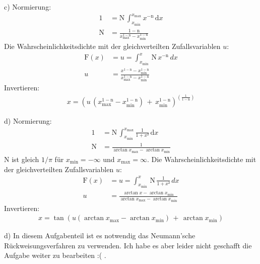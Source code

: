 \documentclass[
  bibliography=totoc,     %
  captions=tableheading,  %
  titlepage=firstiscover, %
]{scrartcl}
\begin{document}
\noindent
c) Normierung:
\begin{align*}
  1 &= \mathup{N}\,\int_{x_{\mathup{min}}}^{x_{\mathup{max}}}x^{-\mathup{n}}\,\mathup{d}x\\
  \mathup{N} &= \frac{1-\mathup{n}}{x_\mathup{max}^{1-\mathup{n}}-x_\mathup{min}^{1-\mathup{n}}}
\end{align*}
Die Wahrscheinlichkeitsdichte mit der gleichverteilten Zufallsvariablen $u$:
\begin{align*}
  \mathup{F}(x) &= u = \int_{x_{\mathup{min}}}^{x}\,\mathup{N}\,x^{-\mathup{n}}\,{d}x \\
  u &= \frac{x^{1-\mathup{n}}-x_\mathup{min}^{1-\mathup{n}}}{x_\mathup{max}^{1-\mathup{n}}-x_\mathup{min}^{1-\mathup{n}}}
\end{align*}
Invertieren:
\begin{align*}
  x = (u\,(x_\mathup{max}^{1-\mathup{n}}-x_\mathup{min}^{1-\mathup{n}})\,+\,x_{\mathup{min}}^{1-\mathup{n}})^{(\frac{1}{1-\mathup{n}})}
\end{align*}

\noindent
d) Normierung:
\begin{align*}
  1 &= \mathup{N}\,\int_{x_{\mathup{min}}}^{x_{\mathup{max}}}\frac{1}{1+x²}\,\mathup{d}x\\
  \mathup{N} &= \frac{1}{\arctan{x_\mathup{max}}-\arctan{x_\mathup{min}}}
\end{align*}
N ist gleich $1/\pi$ für $x_\mathup{min} = -\infty$ und $x_\mathup{max} = \infty$.
Die Wahrscheinlichkeitsdichte mit der gleichverteilten Zufallsvariablen $u$:
\begin{align*}
  \mathup{F}(x) &= u = \int_{x_{\mathup{min}}}^{x}\,\mathup{N}\,\frac{1}{1+x²}\,{d}x \\
  u &= \frac{\arctan{x}-\arctan{x_\mathup{min}}}{\arctan{x_\mathup{max}}-\arctan{x_\mathup{min}}}
\end{align*}
Invertieren:
\begin{align*}
  x =  \tan{(u(\arctan{x_\mathup{max}}-\arctan{x_\mathup{min}})\,+\,\arctan{x_\mathup{min}})}
\end{align*}

\noindent
d) In diesem Aufgabenteil ist es notwendig das Neumann'sche Rückweisungsverfahren zu verwenden.
Ich habe es aber leider nicht geschafft die Aufgabe weiter zu bearbeiten :( .
\end{document}
